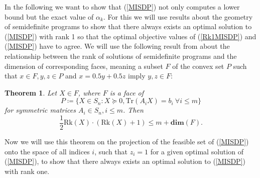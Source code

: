 \documentclass[a4paper,11pt,1p]{elsarticle}
\newtheorem{thm}{Theorem}
\newcommand{\define}{\coloneqq}
\newcommand{\Tr}{\text{Tr}}
\newcommand{\Rk}{\text{Rk}}
\begin{document}
In the following we want to show that (\ref{MISDP}) not only computes a lower bound but the exact value of $\alpha_k$. For this we will use results about the geometry of semidefinite programs to show that there always exists an 
optimal solution to (\ref{MISDP}) with rank 1 so that the optimal objective values of (\ref{Rk1MISDP}) and (\ref{MISDP}) have to agree. We will use the following result from \cite{pat98} about the relationship between the rank of
solutions of semidefinite programs and the dimension of corresponding faces, meaning a subset $F$ of the convex set $P$ such that $x \in F, y, z \in P$ and $x = 0.5y + 0.5z$ imply $y,z \in F$:

\begin{thm}\label{patakiLemma}
 Let $X \in F$, where $F$ is a face of
 \begin{equation*}
 P \define \{X \in S_n : X \succeq 0, \Tr(A_i X) = b_i \ \forall i \leq m\}
 \end{equation*}
 for symmetric matrices $A_i \in S_n, i \leq m$. Then
 \begin{equation*}
  \frac{1}{2}\Rk(X)\cdot(\Rk(X)+1) \leq m + \textbf{dim}(F).
 \end{equation*}
\end{thm}

Now we will use this theorem on the projection of the feasible set of (\ref{MISDP}) onto the space of all indices $i$, such that $z_i = 1$ for a given optimal solution of (\ref{MISDP}), to show that there always exists an optimal 
solution to (\ref{MISDP}) with rank one.
\end{document}

